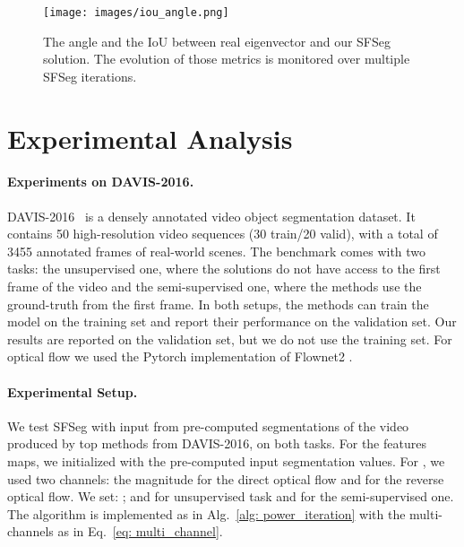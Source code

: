 \documentclass{article}
\begin{document}
\begin{figure}[t]
\begin{center}
    \texttt{[image: images/iou\_angle.png]}
    \end{center}
	\caption{The angle and the IoU between real eigenvector and our SFSeg solution. The evolution of those metrics is monitored over multiple SFSeg iterations.}
	\label{fig: approx}
\end{figure}


\section{Experimental Analysis}
\label{sec: experiments}

\paragraph{Experiments on DAVIS-2016.} DAVIS-2016~\cite{davis2016} is a densely annotated video object segmentation dataset. It contains 50 high-resolution video sequences (30 train/20 valid), with a total of 3455 annotated frames of real-world scenes. The benchmark comes with two tasks: the unsupervised one, where the solutions do not have access to the first frame of the video and the semi-supervised one, where the methods use the ground-truth from the first frame. In both setups, the methods can train the model on the training set and report their performance on the validation set. Our results are reported on the validation set, but we do not use the training set. For optical flow we used the Pytorch implementation of Flownet2 \cite{flownet2-pytorch}.

\paragraph{Experimental Setup.} We test SFSeg with input from pre-computed segmentations of the video produced by top methods from DAVIS-2016, on both tasks. For the features maps, we initialized  with the pre-computed input segmentation values. For , we used two channels: the magnitude for the direct optical flow and for the reverse optical flow. We set: ;  and  for unsupervised task and  for the semi-supervised one. The algorithm is implemented as in Alg.~\ref{alg: power_iteration} with the multi-channels as in Eq.~\ref{eq: multi_channel}.

\end{document}
